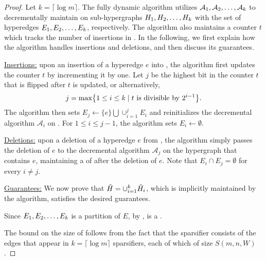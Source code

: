 \begin{proof}

Let \( k = \lceil \log{m} \rceil \).
The fully dynamic algorithm utilizes \( { \mathcal A_1}, { \mathcal A_2}, \dots, { \mathcal A_k} \) to decrementally maintain  \SpectralHypersparsifier{} on sub-hypergraphs \( { H_1}, { H_2}, \dots, { H_k} \) with the set of hyperedges \( { E_1}, { E_2}, \dots, { E_k} \), respectively.
The algorithm also maintains a counter \( t \) which tracks the number of insertions in .
In the following, we first explain how the algorithm handles insertions and deletions, and then discuss its guarantees.

\underline{Insertions:}
upon an insertion of a hyperedge \( e \) into , the algorithm first updates the counter \( t \) by incrementing it by one.
Let \( j \) be the highest bit in the counter \( t \) that is flipped after \( t \) is updated, or alternatively,
\begin{equation*}
j = \max \left\{ 1 \leq i \leq k \mid \text{\( t \) is divisible by \( 2^{i - 1} \)} \right\}.
\end{equation*}
The algorithm then sets \( E_j \gets \{ e \} \bigcup \cup_{i = 1} ^j E_i \) and reinitializes the decremental algorithm \( \mathcal A_i \) on .
For \( 1 \leq i \leq j - 1 \), the algorithm sets \( E_i \gets \emptyset \).

\underline{Deletions:}
upon a deletion of a hyperedge \( e \) from , the algorithm simply passes the deletion of \( e \) to the decremental algorithm \( \mathcal A_j \) on the hypergraph  that contains \( e \), maintaining a \SpectralHypersparsifier{}  of  after the deletion of \( e \).
Note that \( E_i \cap E_j = \emptyset \) for every \( i \neq j \).

\underline{Guarantees:}
We now prove that \( { \tilde H} = \cup_{i = 1} ^k { \tilde H_i} \), which is implicitly maintained by the algorithm, satisfies the desired guarantees.

Since \( { E_1}, { E_2}, \dots, { E_k} \) is a partition of \( E \), by ,  is a \SpectralHypersparsifier{}.

The bound on the size of  follows from the fact that the sparsifier  consists of the edges that appear in \( k = \lceil \log m \rceil \) sparsifiers, each of which of size \( S(m, n, W) \).


\end{proof}
